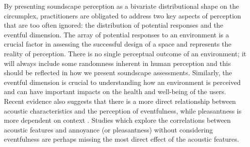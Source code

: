By presenting soundscape perception as a bivariate distributional shape on the circumplex, practitioners are obligated to address two key aspects of perception that are too often ignored: the distribution of potential responses and the eventful dimension. The array of potential responses to an environment is a crucial factor in assessing the successful design of a space and represents the reality of perception. There is no single perceptual outcome of an environment; it will always include some randomness inherent in human perception and this should be reflected in how we present soundscape assessments. Similarly, the eventful dimension is crucial to understanding how an environment is perceived and can have important impacts on the health and well-being of the users. Recent evidence also suggests that there is a more direct relationship between acoustic characteristics and the perception of eventfulness, while pleasantness is more dependent on context \citep{Mitchell2021Investigating}. Studies which explore the correlations between acoustic features and annoyance (or pleasantness) without considering eventfulness are perhaps missing the most direct effect of the acoustic features.


